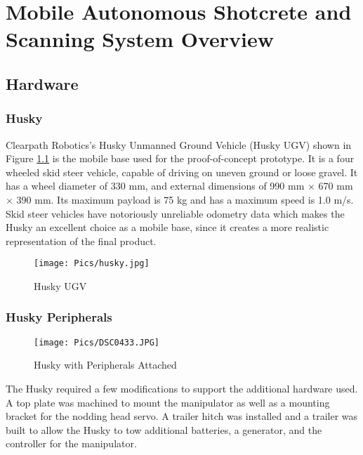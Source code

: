 \chapter{Mobile Autonomous Shotcrete and Scanning System Overview}
\label{chap:overview}
\section{Hardware}
\subsection{Husky}
Clearpath Robotics's Husky Unmanned Ground Vehicle (Husky UGV) shown in Figure \ref{fig:husky} is the mobile base used for the proof-of-concept prototype. It is a four wheeled skid steer vehicle, capable of driving on uneven ground or loose gravel. It has a wheel diameter of 330 mm, and external dimensions of 990 mm $\times$ 670 mm $\times$ 390 mm. Its maximum payload is 75 kg and has a maximum speed is 1.0 m/s. Skid steer vehicles have notoriously unreliable odometry data which makes the Husky an excellent choice as a mobile base, since it creates a more realistic representation of the final product.\\
\begin{figure}[H]
    \centering
    \texttt{[image: Pics/husky.jpg]}
    \caption{Husky UGV \cite{huskypage}}
    \label{fig:husky}
\end{figure}
\subsection{Husky Peripherals}

\begin{figure}[htb]
    \centering
    \texttt{[image: Pics/DSC0433.JPG]}
    \caption{Husky with Peripherals Attached}
    \label{fig:peripherals}
\end{figure}
The Husky required a few modifications to support the additional hardware used. A top plate was machined to mount the manipulator as well as a mounting bracket for the nodding head servo. A trailer hitch was installed and a trailer was built to allow the Husky to tow additional batteries, a generator, and the controller for the manipulator.\\
